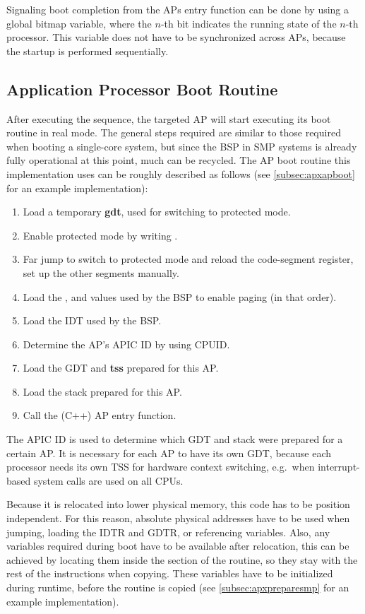 Signaling boot completion from the APs entry function can be done by using a global bitmap variable, where the \(n\)-th bit indicates the running state of the \(n\)-th processor.
This variable does not have to be synchronized across APs, because the startup is performed sequentially.

\subsection{Application Processor Boot Routine}
\label{subsec:apboot}

After executing the  sequence, the targeted AP will start executing its boot routine in real mode.
The general steps required are similar to those required when booting a single-core system, but since the BSP in SMP systems is already fully operational at this point, much can be recycled.
The AP boot routine this implementation uses can be roughly described as follows (see \autoref{subsec:apxapboot} for an example implementation):

\begin{enumerate}
  \item Load a temporary \textbf{\gls{gdt}}, used for switching to protected mode.
  \item Enable protected mode by writing .
  \item Far jump to switch to protected mode and reload the code-segment register, set up the other segments manually.
  \item Load the ,  and  values used by the BSP to enable paging (in that order).
  \item Load the IDT used by the BSP\@.
  \item Determine the AP's APIC ID by using CPUID\@.
  \item Load the GDT and \textbf{\gls{tss}} prepared for this AP\@.
  \item Load the stack prepared for this AP\@.
  \item Call the (C++) AP entry function.
\end{enumerate}

The APIC ID is used to determine which GDT and stack were prepared for a certain AP\@.
It is necessary for each AP to have its own GDT, because each processor needs its own TSS for hardware context switching, e.g.\ when interrupt-based system calls are used on all CPUs.

Because it is relocated into lower physical memory, this code has to be position independent.
For this reason, absolute physical addresses have to be used when jumping, loading the IDTR and GDTR, or referencing variables.
Also, any variables required during boot have to be available after relocation, this can be achieved by locating them inside the  section of the routine, so they stay with the rest of the instructions when copying.
These variables have to be initialized during runtime, before the routine is copied (see \autoref{subsec:apxpreparesmp} for an example implementation).

